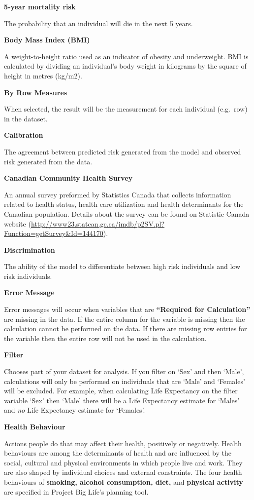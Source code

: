 \documentclass[]{book}
\begin{document}
\textbf{5-year mortality risk}

The probability that an individual will die in the next 5 years.

\textbf{Body Mass Index (BMI)}

A weight-to-height ratio used as an indicator of obesity and
underweight. BMI is calculated by dividing an individual's body weight
in kilograms by the square of height in metres (kg/m2).

\textbf{By Row Measures}

When selected, the result will be the measurement for
each individual (e.g.~row) in the dataset.

\textbf{Calibration}

The agreement between predicted risk generated from the model and
observed risk generated from the data.

\textbf{Canadian Community Health Survey}

An annual survey preformed by Statistics Canada that collects
information related to health status, health care utilization and health
determinants for the Canadian population. Details about the survey can
be found on Statistic Canada website
(\url{http://www23.statcan.gc.ca/imdb/p2SV.pl?Function=getSurvey\&Id=144170}).

\textbf{Discrimination}

The ability of the model to differentiate between high risk individuals
and low risk individuals.

\textbf{Error Message}

Error messages will occur when variables that are
\textbf{``Required for Calculation''} are missing in the data. If the
entire column for the variable is missing then the calculation cannot be
performed on the data. If there are missing row entries for the variable
then the entire row will not be used in the calculation.

\textbf{Filter}

Chooses part of your dataset for analysis. If you filter on
`Sex' and then `Male', calculations will only be performed on
individuals that are `Male' and `Females' will be excluded. For example,
when calculating Life Expectancy on the filter variable `Sex' then
`Male' there will be a Life Expectancy estimate for `Males' and
\emph{no} Life Expectancy estimate for `Females'.

\textbf{Health Behaviour}

Actions people do that may affect their health, positively or
negatively. Health behaviours are among the determinants of health and
are influenced by the social, cultural and physical environments in
which people live and work.\citep{StatsCan2010} They are also shaped by
individual choices and external constraints.\citep{StatsCan2010} The
four health behaviours of \textbf{smoking, alcohol consumption, diet,}
and \textbf{physical activity} are specified in Project Big Life's
planning tool.
\end{document}
